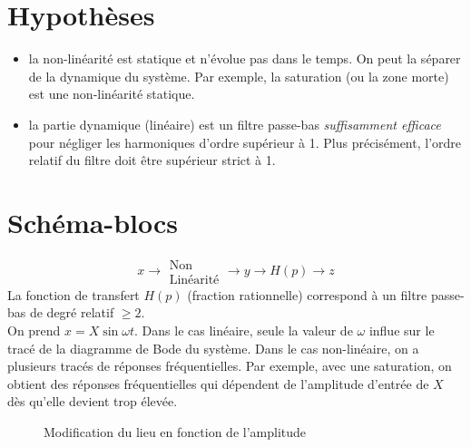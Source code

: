 \documentclass[main.tex]{subfiles}
\begin{document}
\section{Hypothèses}
\begin{itemize}
\item la non-linéarité est statique et n'évolue pas dans le temps. On peut la séparer de la dynamique du système. Par exemple, la saturation (ou la zone morte) est une non-linéarité statique.
\item la partie dynamique (linéaire) est un filtre passe-bas \emph{suffisamment efficace} pour négliger les harmoniques d'ordre supérieur à 1. Plus précisément, l'ordre relatif du filtre doit être supérieur strict à 1.
\end{itemize}

\section{Schéma-blocs}
\[ x \longrightarrow \boxed{
    \begin{array}{c}
      \text{Non} \\
      \text{Linéarité}
    \end{array}
} \longrightarrow y \longrightarrow \boxed{H(p)} \longrightarrow z \]
La fonction de transfert $H(p)$ (fraction rationnelle) correspond à un filtre passe-bas de degré relatif $\geq 2$.\\

On prend $x=X\sin \omega t$. Dans le cas linéaire, seule la valeur de $\omega$ influe sur le tracé de la diagramme de Bode du système. Dans le cas non-linéaire, on a plusieurs tracés de réponses fréquentielles. Par exemple, avec une saturation, on obtient des réponses fréquentielles qui dépendent de l'amplitude d'entrée de $X$ dès qu'elle devient trop élevée.

\begin{figure}[h!]
\centering
{}
 \caption{Modification du lieu en fonction de l'amplitude}
\end{figure}
\end{document}
